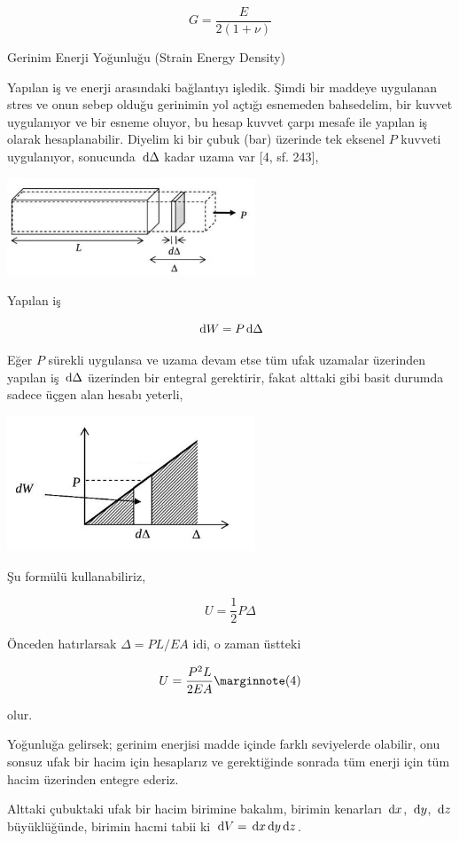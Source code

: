 \documentclass[12pt,fleqn]{article}\usepackage{../../common}
\begin{document}
$$
G = \frac{E}{2(1+\nu)}
$$

Gerinim Enerji Yoğunluğu (Strain Energy Density)

Yapılan iş ve enerji arasındaki bağlantıyı işledik. Şimdi bir maddeye uygulanan
stres ve onun sebep olduğu gerinimin yol açtığı esnemeden bahsedelim, bir kuvvet
uygulanıyor ve bir esneme oluyor, bu hesap kuvvet çarpı mesafe ile yapılan iş
olarak hesaplanabilir. Diyelim ki bir çubuk (bar) üzerinde tek eksenel $P$
kuvveti uygulanıyor, sonucunda $\,\mathrm{d} \Delta$ kadar uzama var [4, sf. 243],

\includegraphics[width=20em]{phy_020_strs_00_07.jpg}

Yapılan iş

$$
\,\mathrm{d} W = P \,\mathrm{d} \Delta
$$

Eğer $P$ sürekli uygulansa ve uzama devam etse tüm ufak uzamalar üzerinden
yapılan iş $\,\mathrm{d} \Delta$ üzerinden bir entegral gerektirir, fakat alttaki
gibi basit durumda sadece üçgen alan hesabı yeterli,

\includegraphics[width=20em]{phy_020_strs_00_08.jpg}

Şu formülü kullanabiliriz,

$$
U = \frac{1}{2} P \Delta
$$

Önceden hatırlarsak $\Delta = PL / EA$ idi, o zaman üstteki 

$$
U = \frac{P^2 L}{2 E A}
\mlabel{4}
$$

olur.

Yoğunluğa gelirsek; gerinim enerjisi madde içinde farklı seviyelerde olabilir,
onu sonsuz ufak bir hacim için hesaplarız ve gerektiğinde sonrada tüm enerji
için tüm hacim üzerinden entegre ederiz.

Alttaki çubuktaki ufak bir hacim birimine bakalım, birimin kenarları $\,\mathrm{d} x$,
$\,\mathrm{d} y$, $\,\mathrm{d} z$ büyüklüğünde, birimin hacmi tabii ki $\,\mathrm{d} V = \,\mathrm{d} x \,\mathrm{d} y \,\mathrm{d}
z$.
\end{document}
